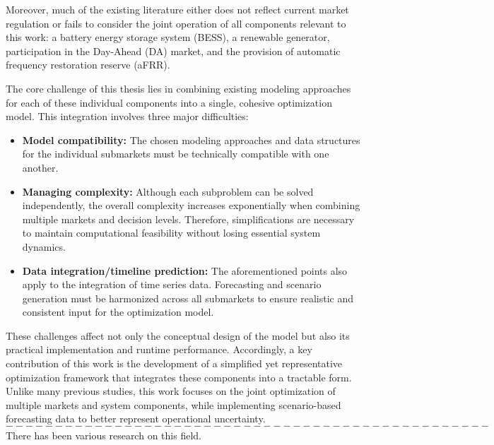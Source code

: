 Moreover, much of the existing literature either does not reflect current market regulation
or fails to consider the joint operation of all components relevant to this work:
a battery energy storage system (BESS), a renewable generator, participation in the Day-Ahead (DA) market,
and the provision of automatic frequency restoration reserve (aFRR).

The core challenge of this thesis lies in combining existing modeling approaches
for each of these individual components into a single, cohesive optimization model.
This integration involves three major difficulties:

\begin{itemize}
	\item \textbf{Model compatibility:} The chosen modeling approaches and data structures
	      for the individual submarkets must be technically compatible with one another.

	\item \textbf{Managing complexity:} Although each subproblem can be solved independently,
	      the overall complexity increases exponentially when combining multiple markets and decision levels.
	      Therefore, simplifications are necessary to maintain computational feasibility
	      without losing essential system dynamics.

	\item \textbf{Data integration/timeline prediction:} The aforementioned points also apply to the integration
	      of time series data. Forecasting and scenario generation must be harmonized across all submarkets
	      to ensure realistic and consistent input for the optimization model.
\end{itemize}

These challenges affect not only the conceptual design of the model but also its practical implementation and runtime performance.
Accordingly, a key contribution of this work is the development of a simplified yet representative optimization framework
that integrates these components into a tractable form.
Unlike many previous studies, this work focuses on the joint optimization of multiple markets and system components,
while implementing scenario-based forecasting data to better represent operational uncertainty.\\

$-------------------------------------------------$\\


There has been various research on this field.


